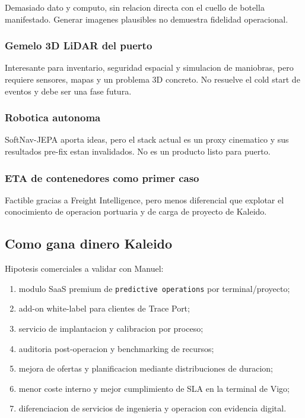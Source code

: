 \documentclass[
  spanish,
  10pt,
  a4paper,
]{article}
\providecommand{\tightlist}{%
  \setlength{\itemsep}{0pt}\setlength{\parskip}{0pt}}
\begin{document}
Demasiado dato y computo, sin relacion directa con el cuello de botella
manifestado. Generar imagenes plausibles no demuestra fidelidad
operacional.

\subsubsection{Gemelo 3D LiDAR del
puerto}\label{gemelo-3d-lidar-del-puerto}

Interesante para inventario, seguridad espacial y simulacion de
maniobras, pero requiere sensores, mapas y un problema 3D concreto. No
resuelve el cold start de eventos y debe ser una fase futura.

\subsubsection{Robotica autonoma}\label{robotica-autonoma}

SoftNav-JEPA aporta ideas, pero el stack actual es un proxy cinematico y
sus resultados pre-fix estan invalidados. No es un producto listo para
puerto.

\subsubsection{ETA de contenedores como primer
caso}\label{eta-de-contenedores-como-primer-caso}

Factible gracias a Freight Intelligence, pero menos diferencial que
explotar el conocimiento de operacion portuaria y de carga de proyecto
de Kaleido.

\subsection{Como gana dinero Kaleido}\label{como-gana-dinero-kaleido}

Hipotesis comerciales a validar con Manuel:

\begin{enumerate}
\def\labelenumi{\arabic{enumi}.}
\tightlist
\item
  modulo SaaS premium de \texttt{predictive\ operations} por
  terminal/proyecto;
\item
  add-on white-label para clientes de Trace Port;
\item
  servicio de implantacion y calibracion por proceso;
\item
  auditoria post-operacion y benchmarking de recursos;
\item
  mejora de ofertas y planificacion mediante distribuciones de duracion;
\item
  menor coste interno y mejor cumplimiento de SLA en la terminal de
  Vigo;
\item
  diferenciacion de servicios de ingenieria y operacion con evidencia
  digital.
\end{enumerate}
\end{document}
